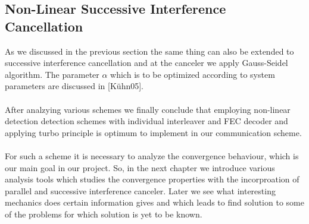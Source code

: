 \subsection{Non-Linear Successive Interference Cancellation}
As we discussed in the previous section the same thing can also be extended to successive interference cancellation and at the canceler we apply Gauss-Seidel algorithm. The parameter $\alpha$ which is to be optimized according to system parameters are discussed in [K\"uhn05]. \\ \\
After analzying various schemes we finally conclude that employing non-linear detection detection schemes with individual interleaver and FEC decoder and applying turbo principle is optimum to implement in our communication scheme. \\ \\
For such a scheme it is necessary to analyze the convergence behaviour, which is our main goal in our project. So, in the next chapter we introduce various analysis tools which studies the convergence properties with the incorproation of parallel and successive interference canceler. Later we see what interesting mechanics does certain information gives and which leads to find solution to some of the problems for which solution is yet to be known. 
